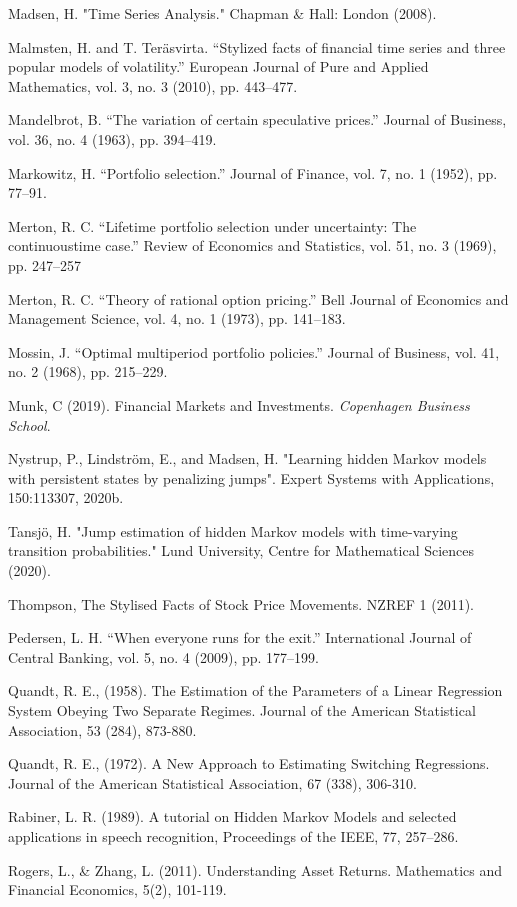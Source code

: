 Madsen, H. "Time Series Analysis." Chapman \& Hall: London (2008).

Malmsten, H. and T. Teräsvirta. “Stylized facts of financial time series and three popular models of volatility.” European Journal of Pure and Applied Mathematics, vol. 3, no. 3 (2010), pp. 443–477.

Mandelbrot, B. “The variation of certain speculative prices.” Journal of Business, vol. 36, no. 4 (1963), pp. 394–419.

Markowitz, H. “Portfolio selection.” Journal of Finance, vol. 7, no. 1 (1952), pp. 77–91.

Merton, R. C. “Lifetime portfolio selection under uncertainty: The continuoustime case.” Review of Economics and Statistics, vol. 51, no. 3 (1969), pp. 247–257

Merton, R. C. “Theory of rational option pricing.” Bell Journal of Economics and Management Science, vol. 4, no. 1 (1973), pp. 141–183.

Mossin, J. “Optimal multiperiod portfolio policies.” Journal of Business, vol. 41,
no. 2 (1968), pp. 215–229.

Munk, C (2019). Financial Markets and Investments. \textit{Copenhagen Business School}.

Nystrup, P., Lindström, E., and Madsen, H. "Learning hidden Markov models with persistent states by penalizing jumps". Expert Systems with Applications, 150:113307, 2020b.

Tansjö, H. "Jump estimation of hidden Markov models with time-varying transition probabilities." Lund University, Centre for Mathematical Sciences (2020).

Thompson, The Stylised Facts of Stock Price Movements. NZREF 1 (2011).

Pedersen, L. H. “When everyone runs for the exit.” International Journal of Central Banking, vol. 5, no. 4 (2009), pp. 177–199.

Quandt, R. E., (1958). The Estimation of the Parameters of a Linear Regression System Obeying Two Separate Regimes. Journal of the American Statistical Association, 53 (284), 873-880.

Quandt, R. E., (1972). A New Approach to Estimating Switching Regressions. Journal of the American
Statistical Association, 67 (338), 306-310.

Rabiner, L. R. (1989). A tutorial on Hidden Markov Models and selected applications in speech recognition, Proceedings of the IEEE, 77, 257–286.

Rogers, L., \& Zhang, L. (2011). Understanding Asset Returns. Mathematics and Financial Economics,
5(2), 101-119.

